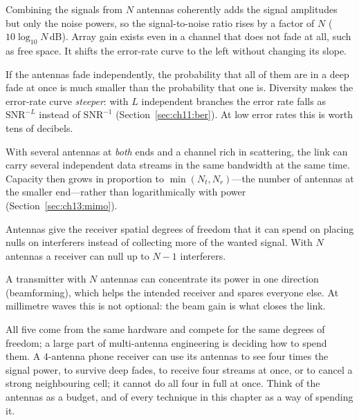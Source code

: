\begin{description}[style=nextline,leftmargin=1.2em,font=\sffamily\bfseries\small\color{navy}]
\item[Array gain.] Combining the signals from $N$ antennas coherently adds the signal amplitudes
but only the noise powers, so the signal-to-noise ratio rises by a factor of $N$
($10\log_{10}N$\,dB). Array gain exists even in a channel that does not fade at all, such as free
space. It shifts the error-rate curve to the left without changing its slope.
\item[Diversity gain.] If the antennas fade independently, the probability that all of them are
in a deep fade at once is much smaller than the probability that one is. Diversity makes the
error-rate curve \emph{steeper}: with $L$ independent branches the error rate falls as
$\text{SNR}^{-L}$ instead of $\text{SNR}^{-1}$ (Section~\ref{sec:ch11:ber}). At low error rates
this is worth tens of decibels.
\item[Spatial multiplexing gain.] With several antennas at \emph{both} ends and a channel rich in
scattering, the link can carry several independent data streams in the same bandwidth at the
same time. Capacity then grows in proportion to $\min(N_t,N_r)$---the number of antennas at the
smaller end---rather than logarithmically with power (Section~\ref{sec:ch13:mimo}).
\item[Interference suppression.] Antennas give the receiver spatial degrees of freedom that it
can spend on placing nulls on interferers instead of collecting more of the wanted signal. With
$N$ antennas a receiver can null up to $N-1$ interferers.
\item[Directivity.] A transmitter with $N$ antennas can concentrate its power in one direction
(beamforming), which helps the intended receiver and spares everyone else. At millimetre waves
this is not optional: the beam gain is what closes the link.
\end{description}

All five come from the same hardware and compete for the same degrees of freedom; a large part of
multi-antenna engineering is deciding how to spend them. A 4-antenna phone receiver can use its
antennas to see four times the signal power, to survive deep fades, to receive four streams at
once, or to cancel a strong neighbouring cell; it cannot do all four in full at once. Think of
the antennas as a budget, and of every technique in this chapter as a way of spending it.


